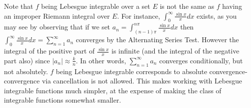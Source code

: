 \begin{rmk}%
	Note that $f$ being Lebesgue integrable over a set $E$ is not the same as $f$ having an 
	improper Riemann integral over $E$. For instance, $\int_0^\infty \frac{\sin x}{x}dx$ 
	exists, as you may see by observing that if we set $a_n = \int_{(n-1)\pi}^{n\pi}\frac{\sin x}{x}dx$ 
	then $\int_0^\infty\frac{\sin x}{x}dx = \sum\limits_{n=1}^\infty a_n$ converges by the 
	Alternating Series Test. However the integral of the positive part of $\frac{\sin x}{x}$ is 
	infinite (and the integral of the negative part also) since $|a_n|\approx \frac{k}{n}$. 
	In other words, $\sum\limits_{n=1}^\infty a_n$ converges conditionally, but not absolutely. 
	$f$ being Lebesgue integrable corresponds to absolute convergence-convergence via cancellation 
	is not allowed. This makes working with Lebesgue integrable functions much simpler, at the 
	expense of making the class of integrable functions somewhat smaller. 
\end{rmk}


